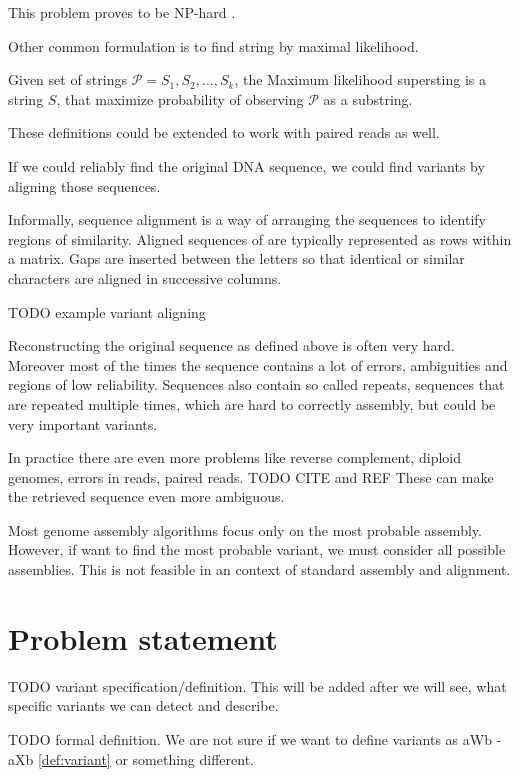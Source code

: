 This problem proves to be NP-hard \cite{gallant1980finding}.

Other common formulation is to find string by maximal likelihood. 
\begin{definicia} 
Given set of strings $\mathcal{P} = {S_1 , S_2 , . . . , S_k }$,
the Maximum likelihood supersting is a string $S$, that maximize probability of observing $\mathcal{P}$ as a substring. 
\end{definicia}

These definitions could be extended to work with paired reads as well.

If we could reliably find the original DNA sequence, we could find variants by aligning those sequences.

Informally, sequence alignment is a way of arranging the sequences to identify regions of similarity. 
Aligned sequences of are typically represented as rows within a matrix. 
Gaps are inserted between the letters so that identical or similar characters are aligned in successive columns.

TODO example variant aligning

Reconstructing the original sequence as defined above is often very hard.
Moreover most of the times the sequence contains a lot of errors, ambiguities and regions of low reliability. 
Sequences also contain so called repeats, sequences that are repeated multiple times, 
which are hard to correctly assembly, but could be very important variants.

In practice there are even more problems like reverse complement, diploid genomes, errors in reads, paired reads.
TODO CITE and REF
These can make the retrieved sequence even more ambiguous.

Most genome assembly algorithms focus only on the most probable assembly. 
However, if want to find the most probable variant, we must consider all possible assemblies. 
This is not feasible in an context of standard assembly and alignment.

\section{Problem statement}

TODO variant specification/definition. This will be added after we will see, what specific variants we can detect and describe.

TODO formal definition. We are not sure if we want to define variants as aWb - aXb \ref{def:variant} or something different.

